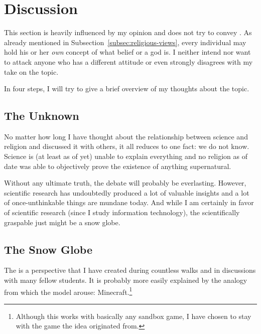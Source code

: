 \section{Discussion}
\label{sec:Discussion}This section is heavily influenced by my opinion and does not try to convey . As already mentioned in Subsection~\ref{subsec:religious-views}, every individual may hold his or her \emph{own} concept of what belief or a god is. I neither intend nor want to attack anyone who has a different attitude or even strongly disagrees with my take on the topic.

In four steps, I will try to give a brief overview of my thoughts about the topic.

\subsection{The Unknown}\label{subsec:the-unknown}
No matter how long I have thought about the relationship between science and religion and discussed it with others, it all reduces to one fact: we do not know. Science is (at least as of yet) unable to explain everything and no religion as of date was able to objectively prove the existence of anything supernatural.

Without any ultimate truth, the debate will probably be everlasting. However, scientific research has undoubtedly produced a lot of valuable insights and a lot of once-unthinkable things are mundane today.
And while I am certainly in favor of scientific research (since I study information technology), the scientifically graspable just might be a snow globe.

\subsection{The Snow Globe}\label{subsec:snow-globe}
The  is a perspective that I have created during countless walks and in discussions with many fellow students.
It is probably more easily explained by the analogy from which the model arouse: Minecraft.\footnote{Although this works with basically any sandbox game, I have chosen to stay with the game the idea originated from.}

